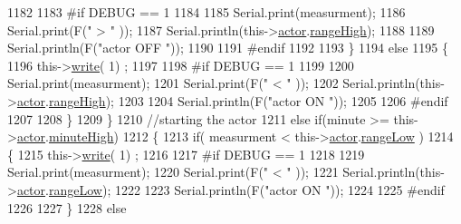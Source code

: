 \begin{DoxyCode}
1182 
1183 \textcolor{preprocessor}{            #if DEBUG == 1 }
1184 
1185                 Serial.print(measurment);
1186                 Serial.print(F(\textcolor{stringliteral}{" > "} ));
1187                 Serial.println(this->\hyperlink{class_cool_board_actor_a8f190db9f7a39fddbcef7f152da970e9}{actor}.\hyperlink{struct_cool_board_actor_1_1state_a6e5cd6c5cd44e2decfd8d4df1853f8e3}{rangeHigh});
1188 
1189                 Serial.println(F(\textcolor{stringliteral}{"actor OFF "}));
1190 
1191 \textcolor{preprocessor}{            #endif}
1192     
1193             \}
1194             \textcolor{keywordflow}{else} 
1195             \{
1196                 this->\hyperlink{class_cool_board_actor_a958786ff01ea1056ee72c72d439f86da}{write}( 1) ;
1197 
1198 \textcolor{preprocessor}{            #if DEBUG == 1 }
1199 
1200                 Serial.print(measurment);
1201                 Serial.print(F(\textcolor{stringliteral}{" < "} ));
1202                 Serial.println(this->\hyperlink{class_cool_board_actor_a8f190db9f7a39fddbcef7f152da970e9}{actor}.\hyperlink{struct_cool_board_actor_1_1state_a6e5cd6c5cd44e2decfd8d4df1853f8e3}{rangeHigh});
1203 
1204                 Serial.println(F(\textcolor{stringliteral}{"actor ON "}));
1205 
1206 \textcolor{preprocessor}{            #endif  }
1207                 
1208             \}
1209     \}   
1210     \textcolor{comment}{//starting the actor}
1211     \textcolor{keywordflow}{else} \textcolor{keywordflow}{if}(minute >= this->\hyperlink{class_cool_board_actor_a8f190db9f7a39fddbcef7f152da970e9}{actor}.\hyperlink{struct_cool_board_actor_1_1state_a4bff3d61ead74adb60be224764b93006}{minuteHigh})
1212     \{
1213             \textcolor{keywordflow}{if}( measurment < this->\hyperlink{class_cool_board_actor_a8f190db9f7a39fddbcef7f152da970e9}{actor}.\hyperlink{struct_cool_board_actor_1_1state_a43f891c9fb3bb63575c27cec860de55a}{rangeLow} )
1214             \{
1215                 this->\hyperlink{class_cool_board_actor_a958786ff01ea1056ee72c72d439f86da}{write}( 1) ;
1216 
1217 \textcolor{preprocessor}{            #if DEBUG == 1 }
1218 
1219                 Serial.print(measurment);
1220                 Serial.print(F(\textcolor{stringliteral}{" < "} ));
1221                 Serial.println(this->\hyperlink{class_cool_board_actor_a8f190db9f7a39fddbcef7f152da970e9}{actor}.\hyperlink{struct_cool_board_actor_1_1state_a43f891c9fb3bb63575c27cec860de55a}{rangeLow});
1222 
1223                 Serial.println(F(\textcolor{stringliteral}{"actor ON "}));
1224 
1225 \textcolor{preprocessor}{            #endif  }
1226 
1227             \}
1228             \textcolor{keywordflow}{else} 

\end{DoxyCode}
